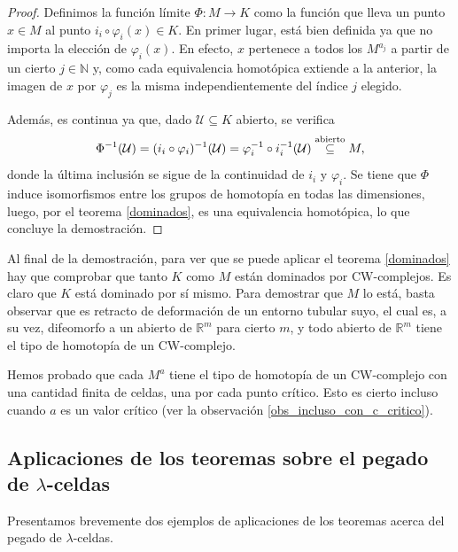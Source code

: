 \begin{proof}
    Definimos la función límite $\Phi:M\to K$ como la función que lleva un punto $x\in M$ al punto $i_i\circ \varphi_i(x)\in K$. En primer lugar, está bien definida ya que no importa la elección de $\varphi_i(x)$. En efecto, $x$ pertenece a todos los $M^{a_j}$ a partir de un cierto $j\in\mathbb{N}$ y, como cada equivalencia homotópica extiende a la anterior, la imagen de $x$ por $\varphi_j$ es la misma independientemente del índice $j$ elegido.
    
    Además, es continua ya que, dado $\mathcal{U}\subseteq K$ abierto, se verifica
    \begin{equation*}
        \Phi^{-1}(\mathcal{U})= (i_i\circ \varphi_i)^{-1}(\mathcal{U})= \varphi_i^{-1}\circ i_i^{-1}(\mathcal{U}) \overset{\text{\scriptsize abierto}}{\subseteq} M,
    \end{equation*}
    donde la última inclusión se sigue de la continuidad de $i_i$ y $\varphi_i$. Se tiene que $\Phi$ induce isomorfismos entre los grupos de homotopía en todas las dimensiones, luego, por el teorema \ref{dominados}, es una equivalencia homotópica, lo que concluye la demostración.

\end{proof}
\begin{remark}
    Al final de la demostración, para ver que se puede aplicar el teorema \ref{dominados} hay que comprobar que tanto $K$ como $M$ están dominados por CW-complejos. Es claro que $K$ está dominado por sí mismo. Para demostrar que $M$ lo está, basta observar que es retracto de deformación de un entorno tubular suyo, el cual es, a su vez, difeomorfo a un abierto de $\mathbb{R}^m$ para cierto $m$, y todo abierto de $\mathbb{R}^m$ tiene el tipo de homotopía de un CW-complejo.
\end{remark}

\begin{remark}
    Hemos probado que cada $M^a$ tiene el tipo de homotopía de un CW-complejo con una cantidad finita de celdas, una por cada punto crítico. Esto es cierto incluso cuando $a$ es un valor crítico (ver la observación \ref{obs_incluso_con_c_critico}).
\end{remark}




\newpage
\subsection{Aplicaciones de los teoremas sobre el pegado de $\lambda$-celdas}\label{subsec:aplicaciones}
Presentamos brevemente dos ejemplos de aplicaciones de los teoremas acerca del pegado de $\lambda$-celdas.

